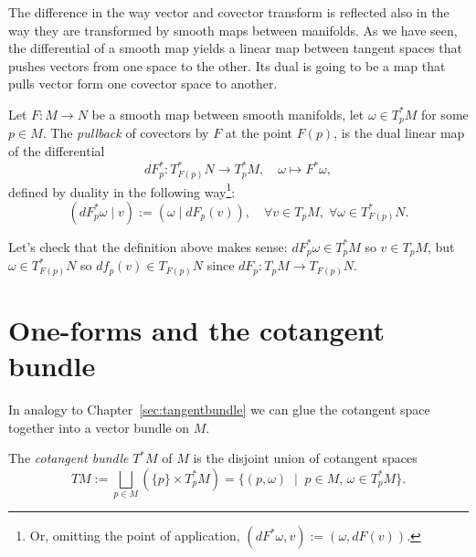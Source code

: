 The difference in the way vector and covector transform is reflected also in the way they are transformed by smooth maps between manifolds.
As we have seen, the differential of a smooth map yields a linear map between tangent spaces that pushes vectors from one space to the other.
Its dual is going to be a map that pulls vector form one covector space to another.

\begin{definition}\label{def:pullback:oneform}
  Let $F:M\to N$ be a smooth map between smooth manifolds, let $\omega\in T^*_pM$ for some $p\in M$.
  The \emph{pullback} of covectors by $F$ at the point $F(p)$, is the dual linear map of the differential
  \begin{equation}
    dF^*_p : T^*_{F(p)} N \to T^*_p M, \quad \omega \mapsto F^*\omega,
  \end{equation}
  defined by duality in the following way\footnote{Or, omitting the point of application, $\left(dF^*\omega, v\right) := \left(\omega, dF(v)\right)$.}:
  \begin{equation}
    \left(dF^*_p\omega \mid v\right) := \left(\omega \mid dF_p(v)\right),\quad
    \forall v\in T_pM,\; \forall \omega\in T^*_{F(p)}N.
  \end{equation}
\end{definition}
\noindent Let's check that the definition above makes sense: $dF^*_p \omega \in T^*_p M$ so $v\in T_p M$, but $\omega\in T^*_{F(p)}N$ so $df_p(v)\in T_{F(p)}N$ since $dF_p: T_pM\to T_{F(p)}N$.

\section{One-forms and the cotangent bundle}

In analogy to Chapter~\ref{sec:tangentbundle} we can glue the cotangent space together into a vector bundle on $M$.

\begin{definition}
  The \emph{cotangent bundle} $T^*M$ of $M$ is the disjoint union of cotangent spaces
  \begin{equation}
    TM := \bigsqcup_{p\in M}\left(\{p\}\times T^*_pM\right)
       = \{(p,\omega) \;\mid\; p\in M,\, \omega\in T^*_pM\}.
  \end{equation}
\end{definition}


